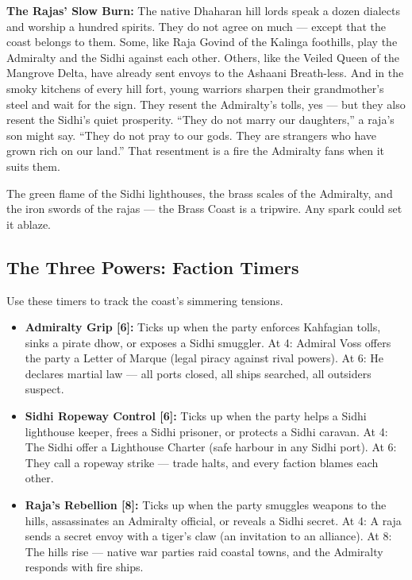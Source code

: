 \noindent
\textbf{The Rajas' Slow Burn:} The native Dhaharan hill lords speak a dozen dialects and worship a hundred spirits. They do not agree on much --- except that the coast belongs to them. Some, like Raja Govind of the Kalinga foothills, play the Admiralty and the Sidhi against each other. Others, like the Veiled Queen of the Mangrove Delta, have already sent envoys to the Ashaani Breath-less. And in the smoky kitchens of every hill fort, young warriors sharpen their grandmother's steel and wait for the sign. They resent the Admiralty's tolls, yes --- but they also resent the Sidhi's quiet prosperity. ``They do not marry our daughters,'' a raja's son might say. ``They do not pray to our gods. They are strangers who have grown rich on our land.'' That resentment is a fire the Admiralty fans when it suits them.

\noindent
The green flame of the Sidhi lighthouses, the brass scales of the Admiralty, and the iron swords of the rajas --- the Brass Coast is a tripwire. Any spark could set it ablaze.

\subsection*{The Three Powers: Faction Timers}
Use these timers to track the coast's simmering tensions.

\begin{itemize}
\item \textbf{Admiralty Grip [6]:} Ticks up when the party enforces Kahfagian tolls, sinks a pirate dhow, or exposes a Sidhi smuggler. At 4: Admiral Voss offers the party a Letter of Marque (legal piracy against rival powers). At 6: He declares martial law --- all ports closed, all ships searched, all outsiders suspect.
\item \textbf{Sidhi Ropeway Control [6]:} Ticks up when the party helps a Sidhi lighthouse keeper, frees a Sidhi prisoner, or protects a Sidhi caravan. At 4: The Sidhi offer a Lighthouse Charter (safe harbour in any Sidhi port). At 6: They call a ropeway strike --- trade halts, and every faction blames each other.
\item \textbf{Raja's Rebellion [8]:} Ticks up when the party smuggles weapons to the hills, assassinates an Admiralty official, or reveals a Sidhi secret. At 4: A raja sends a secret envoy with a tiger's claw (an invitation to an alliance). At 8: The hills rise --- native war parties raid coastal towns, and the Admiralty responds with fire ships.
\end{itemize}

